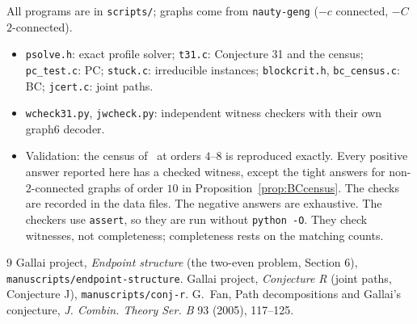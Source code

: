 \documentclass[11pt]{amsart}
\theoremstyle{definition}
\begin{document}
All programs are in \texttt{scripts/}; graphs come from \texttt{nauty-geng} ($-c$ connected, $-C$
$2$-connected).
\begin{itemize}
\item \texttt{psolve.h}: exact profile solver; \texttt{t31.c}: Conjecture 31 and the census;
\texttt{pc\_test.c}: PC; \texttt{stuck.c}: irreducible instances; \texttt{blockcrit.h},
\texttt{bc\_census.c}: BC; \texttt{jcert.c}: joint paths.
\item \texttt{wcheck31.py}, \texttt{jwcheck.py}: independent witness checkers with their own graph6 decoder.
\item Validation: the census of~\cite{EP} at orders $4$--$8$ is reproduced exactly. Every positive answer
reported here has a checked witness, except the tight answers for non-$2$-connected graphs of order $10$ in
Proposition~\ref{prop:BCcensus}. The checks are recorded in the data files. The negative answers are
exhaustive. The checkers use \texttt{assert}, so they are run without \texttt{python -O}. They check
witnesses, not completeness; completeness rests on the matching counts.
\end{itemize}

\begin{thebibliography}{9}
 Gallai project, \emph{Endpoint structure} (the two-even problem, Section 6),
\texttt{manuscripts/endpoint-structure}.
 Gallai project, \emph{Conjecture R} (joint paths, Conjecture J), \texttt{manuscripts/conj-r}.
 G.~Fan, Path decompositions and Gallai's conjecture, \emph{J. Combin. Theory Ser. B} 93
(2005), 117--125.
\end{thebibliography}
\end{document}
